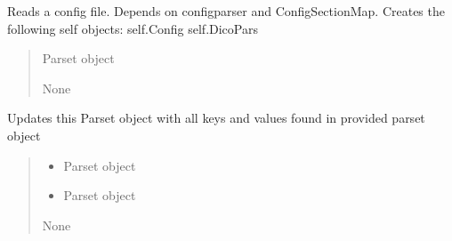 \documentclass[letterpaper,10pt,english]{sphinxmanual}
\begin{document}
\begin{fulllineitems}
\begin{fulllineitems}
\label{\detokenize{api/killMS.Parset:killMS.Parset.ReadCFG.Parset.Read}}
\pysigstartsignatures
{}
\pysigstopsignatures
\sphinxAtStartPar
Reads a config file. Depends on configparser and ConfigSectionMap.
Creates the following self objects:
self.Config
self.DicoPars
\begin{quote}\begin{description}
\sphinxAtStartPar
{} \textendash{} Parset object

\sphinxAtStartPar
None

\end{description}\end{quote}

\end{fulllineitems}


\begin{fulllineitems}
\label{\detokenize{api/killMS.Parset:killMS.Parset.ReadCFG.Parset.update}}
\pysigstartsignatures
{}
\pysigstopsignatures
\sphinxAtStartPar
Updates this Parset object with all keys and values found in provided parset object
\begin{quote}\begin{description}
\begin{itemize}
\item {} 
\sphinxAtStartPar
{} \textendash{} Parset object

\item {} 
\sphinxAtStartPar
{} \textendash{} Parset object

\end{itemize}

\sphinxAtStartPar
None

\end{description}\end{quote}

\end{fulllineitems}


\end{fulllineitems}
\end{document}
